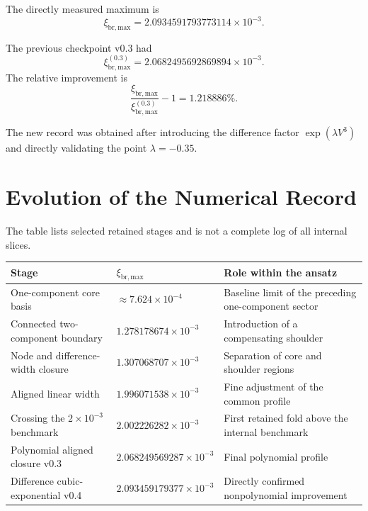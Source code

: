 \documentclass[11pt,a4paper]{article}
\newcommand{\xibr}{\xi_{\mathrm{br,max}}}
\newcommand{\vac}{V}
\begin{document}
The directly measured maximum is
\begin{equation}
\boxed{\xibr=2.0934591793773114\times10^{-3}}.
\label{eq:retained_fold}
\end{equation}

The previous checkpoint v0.3 had
\begin{equation}
\xibr^{(0.3)}=2.0682495692869894\times10^{-3}.
\end{equation}
The relative improvement is
\begin{equation}
\frac{\xibr}{\xibr^{(0.3)}}-1
=1.218886\%.
\end{equation}

The new record was obtained after introducing the difference factor $\exp(\lambda\vac^3)$ and directly validating the point $\lambda=-0.35$.

\section{Evolution of the Numerical Record}

The table lists selected retained stages and is not a complete log of all internal slices.

\begin{center}
\small
\begin{tabular}{@{}p{}p{}p{}@{}}
\textbf{Stage} & \textbf{$\xibr$} & \textbf{Role within the ansatz} \\
\hline
One-component core basis & $\approx7.624\times10^{-4}$ & Baseline limit of the preceding one-component sector \\
Connected two-component boundary & $1.278178674\times10^{-3}$ & Introduction of a compensating shoulder \\
Node and difference-width closure & $1.307068707\times10^{-3}$ & Separation of core and shoulder regions \\
Aligned linear width & $1.996071538\times10^{-3}$ & Fine adjustment of the common profile \\
Crossing the $2\times10^{-3}$ benchmark & $2.002226282\times10^{-3}$ & First retained fold above the internal benchmark \\
Polynomial aligned closure v0.3 & $2.068249569287\times10^{-3}$ & Final polynomial profile \\
Difference cubic-exponential v0.4 & $2.093459179377\times10^{-3}$ & Directly confirmed nonpolynomial improvement \\
\end{tabular}
\end{center}
\end{document}
